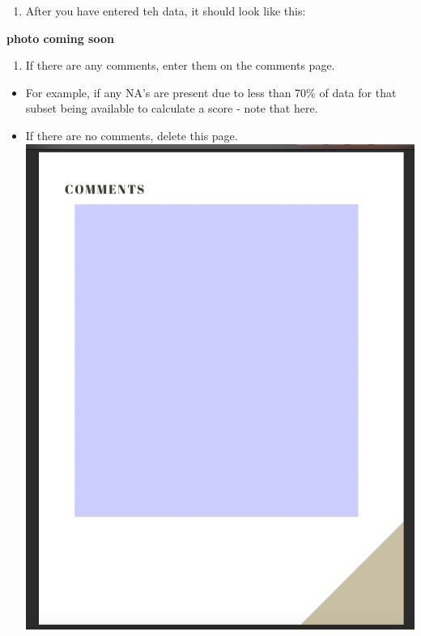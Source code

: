 \documentclass[]{book}
\providecommand{\tightlist}{%
  \setlength{\itemsep}{0pt}\setlength{\parskip}{0pt}}
\begin{document}
\begin{enumerate}
\def\labelenumi{\arabic{enumi}.}
\setcounter{enumi}{3}
\tightlist
\item
  After you have entered teh data, it should look like this:
\end{enumerate}

\textbf{photo coming soon}

\begin{enumerate}
\def\labelenumi{\arabic{enumi}.}
\setcounter{enumi}{4}
\tightlist
\item
  If there are any comments, enter them on the comments page.
\end{enumerate}

\begin{itemize}
\tightlist
\item
  For example, if any NA's are present due to less than 70\% of data for that subset being available to calculate a score - note that here.
\item
  If there are no comments, delete this page.
  \includegraphics{images/report_card_online/5.png}
\end{itemize}
\end{document}
